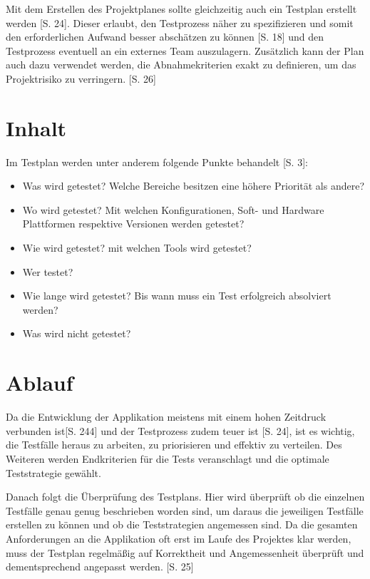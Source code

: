 \documentclass[a4paper,bibtotoc,oneside]{scrbook}
\begin{document}
Mit dem Erstellen des Projektplanes sollte gleichzeitig auch ein Testplan erstellt werden \cite{eval_automat_webapp_test}[S. 24]. Dieser erlaubt, den Testprozess näher zu spezifizieren und somit den erforderlichen Aufwand besser abschätzen zu können \cite{test_large_systems}[S. 18] und den Testprozess eventuell an ein externes Team auszulagern. Zusätzlich kann der Plan auch dazu verwendet werden, die Abnahmekriterien exakt zu definieren, um das Projektrisiko zu verringern. \cite{eval_automat_webapp_test}[S. 26]

\section{Inhalt}
Im Testplan werden unter anderem folgende Punkte behandelt \cite{test_auto}[S. 3]:

\begin{itemize}
	\item Was wird getestet? Welche Bereiche besitzen eine höhere Priorität als andere?
	\item Wo wird getestet? Mit welchen Konfigurationen, Soft- und Hardware Plattformen respektive Versionen werden getestet?
	\item Wie wird getestet? mit welchen Tools wird getestet?
	\item Wer testet?
	\item Wie lange wird getestet? Bis wann muss ein Test erfolgreich absolviert werden?
	\item Was wird nicht getestet?
\end{itemize}


\section{Ablauf}
Da die Entwicklung der Applikation meistens mit einem hohen Zeitdruck verbunden ist\cite{software_qual}[S. 244] und der Testprozess zudem teuer ist \cite{eval_regression}[S. 24], ist es wichtig, die Testfälle heraus zu arbeiten, zu priorisieren und effektiv zu verteilen. Des Weiteren werden Endkriterien für die Tests veranschlagt und die optimale Teststrategie gewählt.

Danach folgt die Überprüfung des Testplans. Hier wird überprüft ob die einzelnen Testfälle genau genug beschrieben worden sind, um daraus die jeweiligen Testfälle erstellen zu können und ob die Teststrategien angemessen sind. Da die gesamten Anforderungen an die Applikation oft erst im Laufe des Projektes klar werden, muss der Testplan regelmäßig auf Korrektheit und Angemessenheit überprüft und dementsprechend angepasst werden. \cite{eval_regression}[S. 25] 
\end{document}
